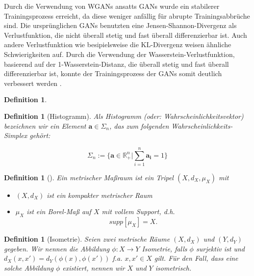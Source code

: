 \documentclass[11pt,a4paper]{article}
\def\emph#1{\textit{#1}}
\newtheorem{definition}[theorem]{Definition}
\numberwithin{equation}{section}
\begin{document}
	Durch die Verwendung von WGANs ansatts GANs wurde ein stabilerer Trainingsprozess erreicht, da diese weniger anfällig für abrupte Trainingsabbrüche sind. Die ursprünglichen GANs benutzten eine Jensen-Shannon-Divergenz als Verlustfunktion, die nicht überall stetig und fast überall differenzierbar ist. Auch andere Verlustfunktion wie besipielsweise die KL-Divergenz weisen ähnliche Schwierigkeiten auf. Durch die Verwendung der Wasserstein-Verlustfunktion, basierend auf der 1-Wasserstein-Distanz, die überall stetig und fast überall differenzierbar ist, konnte der Trainingsprozess der GANs somit deutlich verbessert werden \cite{mauryaoptimal}.
	
	
	
	\begin{definition}
		
	\end{definition}
	
	\begin{definition}[Histogramm]
		Als Histogramm (oder: Wahrscheinlichkeitsvektor) bezeichnen wir ein Element $\boldsymbol{a} \in \Sigma_n$, das zum folgenden Wahrscheinlichkeits-Simplex gehört:
		
		\begin{equation*}
		\Sigma_n := \lbrace \boldsymbol{a} \in \mathbb{R}_{+}^n | \sum_{i=1}^n{\boldsymbol{a_i} = 1} \rbrace
		\end{equation*}
	\end{definition}
	
	
	\begin{definition}[\cite{gromov2007metric}]
		Ein \emph{metrischer Maßraum} ist ein Tripel $(X,d_X,\mu_X)$ mit
		\begin{itemize}
			\item $(X, d_X)$ ist ein kompakter metrischer Raum
			\item $\mu_X$ ist ein Borel-Maß auf $X$ mit vollem Support, d.h. 
			\begin{equation}
			supp[\mu_X] = X.\label{eq:bed_mmspaces}
			\end{equation} 
		\end{itemize}
	\end{definition}
	
	\begin{definition}[Isometrie]
		Seien zwei metrische Räume $(X, d_X)$ und $(Y,d_Y)$ gegeben. Wir nennen die Abbildung $\phi:X \to Y$ Isometrie, falls $\phi$ surjektiv ist und $d_X(x,x')= d_Y(\phi(x),\phi(x'))$ f.a. $x, x' \in X$ gilt. Für den Fall, dass eine solche Abbildung $\phi$ existiert, nennen wir $X$ und $Y$ isometrisch.
	\end{definition}
\end{document}
